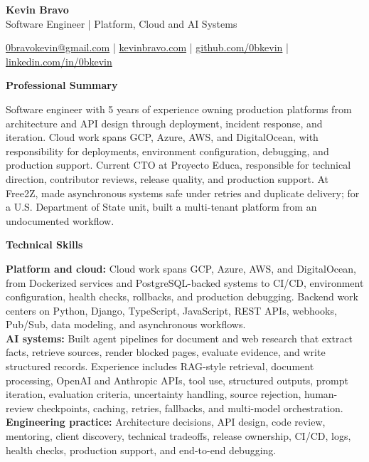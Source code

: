 \documentclass[10pt]{article}
\newcommand{\sectiontitle}[1]{%
    \vspace{4pt}
    \begin{center}
        \textbf{#1}
    \end{center}
    \vspace{-5pt}
}
\begin{document}
\raggedright

\begin{center}
    {\LARGE \textbf{Kevin Bravo}}\\
    Software Engineer | Platform, Cloud and AI Systems \\
    \hrulefill
\end{center}

\begin{center}
    \href{mailto:0bravokevin@gmail.com}{0bravokevin@gmail.com}
    | \href{https://kevinbravo.com}{kevinbravo.com}
    | \href{https://github.com/0bkevin}{github.com/0bkevin}
    | \href{https://www.linkedin.com/in/0bkevin/}{linkedin.com/in/0bkevin}
\end{center}

\fontsize{9.8}{10.9}\selectfont

\sectiontitle{Professional Summary}
Software engineer with 5 years of experience owning production platforms from architecture and API design through deployment, incident response, and iteration. Cloud work spans GCP, Azure, AWS, and DigitalOcean, with responsibility for deployments, environment configuration, debugging, and production support. Current CTO at Proyecto Educa, responsible for technical direction, contributor reviews, release quality, and production support. At Free2Z, made asynchronous systems safe under retries and duplicate delivery; for a U.S. Department of State unit, built a multi-tenant platform from an undocumented workflow.

\sectiontitle{Technical Skills}
\textbf{Platform and cloud:} Cloud work spans GCP, Azure, AWS, and DigitalOcean, from Dockerized services and PostgreSQL-backed systems to CI/CD, environment configuration, health checks, rollbacks, and production debugging. Backend work centers on Python, Django, TypeScript, JavaScript, REST APIs, webhooks, Pub/Sub, data modeling, and asynchronous workflows. \\
\textbf{AI systems:} Built agent pipelines for document and web research that extract facts, retrieve sources, render blocked pages, evaluate evidence, and write structured records. Experience includes RAG-style retrieval, document processing, OpenAI and Anthropic APIs, tool use, structured outputs, prompt iteration, evaluation criteria, uncertainty handling, source rejection, human-review checkpoints, caching, retries, fallbacks, and multi-model orchestration. \\
\textbf{Engineering practice:} Architecture decisions, API design, code review, mentoring, client discovery, technical tradeoffs, release ownership, CI/CD, logs, health checks, production support, and end-to-end debugging.
\end{document}
